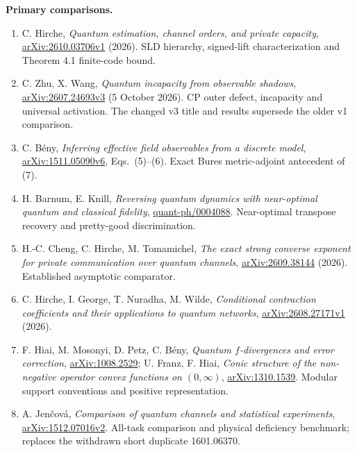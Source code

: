\documentclass[10pt,a4paper]{article}
\begin{document}
\textbf{Primary comparisons.}\small\raggedright
\begin{enumerate}
\item C. Hirche, \emph{Quantum estimation, channel orders, and private capacity}, \href{https://arxiv.org/html/2610.03706v1}{arXiv:2610.03706v1} (2026). SLD hierarchy, signed-lift characterization and Theorem 4.1 finite-code bound.
\item C. Zhu, X. Wang, \emph{Quantum incapacity from observable shadows}, \href{https://arxiv.org/html/2607.24693v3}{arXiv:2607.24693v3} (5 October 2026). CP outer defect, incapacity and universal activation. The changed v3 title and results supersede the older v1 comparison.
\item C. B\'eny, \emph{Inferring effective field observables from a discrete model}, \href{https://arxiv.org/html/1511.05090v6}{arXiv:1511.05090v6}, Eqs.~(5)--(6). Exact Bures metric-adjoint antecedent of (7).
\item H. Barnum, E. Knill, \emph{Reversing quantum dynamics with near-optimal quantum and classical fidelity}, \href{https://arxiv.org/abs/quant-ph/0004088}{quant-ph/0004088}. Near-optimal transpose recovery and pretty-good discrimination.
\item H.-C. Cheng, C. Hirche, M. Tomamichel, \emph{The exact strong converse exponent for private communication over quantum channels}, \href{https://arxiv.org/abs/2609.38144}{arXiv:2609.38144} (2026). Established asymptotic comparator.
\item C. Hirche, I. George, T. Nuradha, M. Wilde, \emph{Conditional contraction coefficients and their applications to quantum networks}, \href{https://arxiv.org/html/2608.27171v1}{arXiv:2608.27171v1} (2026).
\item F. Hiai, M. Mosonyi, D. Petz, C. B\'eny, \emph{Quantum $f$-divergences and error correction}, \href{https://arxiv.org/abs/1008.2529}{arXiv:1008.2529}; U. Franz, F. Hiai, \emph{Conic structure of the non-negative operator convex functions on $(0,\infty)$}, \href{https://arxiv.org/abs/1310.1539}{arXiv:1310.1539}. Modular support conventions and positive representation.
\item A. Jen\v cov\'a, \emph{Comparison of quantum channels and statistical experiments}, \href{https://arxiv.org/abs/1512.07016}{arXiv:1512.07016v2}. All-task comparison and physical deficiency benchmark; replaces the withdrawn short duplicate 1601.06370.
\end{enumerate}
\end{document}
